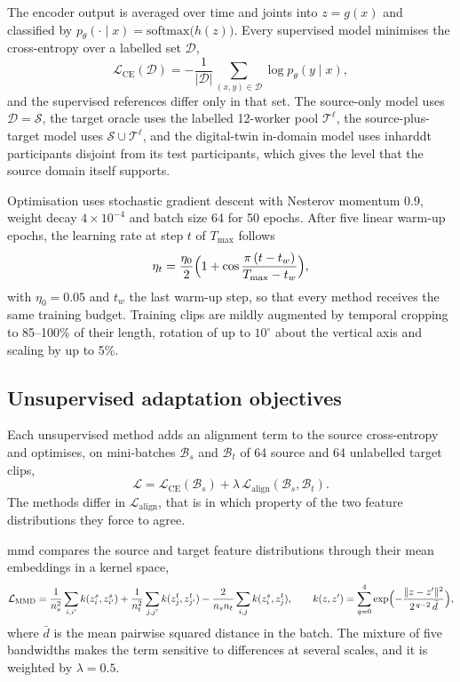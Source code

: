 \documentclass[]{interact}
\begin{document}
The encoder output is averaged over time and joints into $z=g(x)$ and
classified by $p_\theta(\cdot\mid x)=\mathrm{softmax}\bigl(h(z)\bigr)$. Every
supervised model minimises the cross-entropy over a labelled set $\mathcal{D}$,
\begin{equation}
  \mathcal{L}_{\mathrm{CE}}(\mathcal{D})=-\frac{1}{|\mathcal{D}|}
  \sum_{(x,y)\in\mathcal{D}}\log p_\theta(y\mid x),
  \label{eq:ce}
\end{equation}
and the supervised references differ only in that set. The source-only model
uses $\mathcal{D}=\mathcal{S}$, the target oracle uses the labelled 12-worker
pool $\mathcal{T}^{\ell}$, the source-plus-target model uses
$\mathcal{S}\cup\mathcal{T}^{\ell}$, and the digital-twin in-domain model uses
\acs{inharddt} participants disjoint from its test participants, which gives
the level that the source domain itself supports.

Optimisation uses stochastic gradient descent with Nesterov momentum $0.9$,
weight decay $4\times10^{-4}$ and batch size 64 for 50 epochs. After five
linear warm-up epochs, the learning rate at step $t$ of $T_{\max}$ follows
\begin{equation}
  \eta_t=\frac{\eta_0}{2}\Bigl(1+\cos\frac{\pi\,(t-t_w)}{T_{\max}-t_w}\Bigr),
  \label{eq:lr}
\end{equation}
with $\eta_0=0.05$ and $t_w$ the last warm-up step, so that every method
receives the same training budget. Training clips are mildly augmented by
temporal cropping to 85--100\% of their length, rotation of up to $10^\circ$
about the vertical axis and scaling by up to 5\%.

\subsection{Unsupervised adaptation objectives}

Each unsupervised method adds an alignment term to the source cross-entropy and
optimises, on mini-batches $\mathcal{B}_s$ and $\mathcal{B}_t$ of 64 source and
64 unlabelled target clips,
\begin{equation}
  \mathcal{L}=\mathcal{L}_{\mathrm{CE}}(\mathcal{B}_s)
  +\lambda\,\mathcal{L}_{\mathrm{align}}(\mathcal{B}_s,\mathcal{B}_t).
  \label{eq:uda}
\end{equation}
The methods differ in $\mathcal{L}_{\mathrm{align}}$, that is in which property
of the two feature distributions they force to agree.

\ac{mmd} \citep{long2015dan} compares the source and target feature
distributions through their mean embeddings in a kernel space,
\begin{equation}
  \mathcal{L}_{\mathrm{MMD}}=\frac{1}{n_s^2}\sum_{i,i'}k(z_i^s,z_{i'}^s)
  +\frac{1}{n_t^2}\sum_{j,j'}k(z_j^t,z_{j'}^t)
  -\frac{2}{n_sn_t}\sum_{i,j}k(z_i^s,z_j^t),\qquad
  k(z,z')=\sum_{q=0}^{4}\exp\Bigl(-\frac{\|z-z'\|^2}{2^{\,q-2}\,\bar{d}}\Bigr),
  \label{eq:mmd}
\end{equation}
where $\bar{d}$ is the mean pairwise squared distance in the batch. The mixture
of five bandwidths makes the term sensitive to differences at several scales,
and it is weighted by $\lambda=0.5$.
\end{document}

